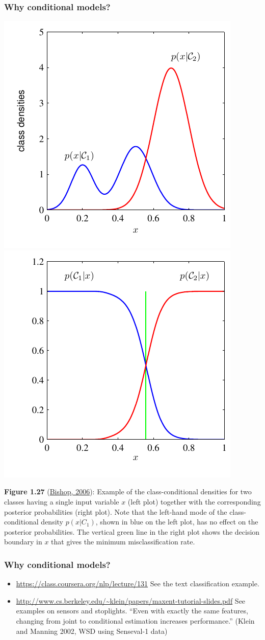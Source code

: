 \documentclass[ignorenonframetext,plain,fleqn]{beamer}
\begin{document}
\begin{frame}\frametitle{Why conditional models?}
\begin{center}
\includegraphics[width=.5\textwidth]{images/bishop-fig-1-27a.pdf}
\includegraphics[width=.5\textwidth]{images/bishop-fig-1-27b.pdf}
\end{center}
\scriptsize {\bf Figure 1.27}
(\href{http://research.microsoft.com/en-us/um/people/cmbishop/prml}
{Bishop, 2006}): Example of the class-conditional densities for two
classes having a single input variable $x$ (left plot) together with
the corresponding posterior probabilities (right plot). Note that the
left-hand mode of the class-conditional density $p(x|C_1)$, shown in
blue on the left plot, has no effect on the posterior
probabilities. The vertical green line in the right plot shows the
decision boundary in $x$ that gives the minimum misclassiﬁcation rate.
\end{frame}

\begin{frame}\frametitle{Why conditional models?}
\begin{itemize}
\item \url{https://class.coursera.org/nlp/lecture/131}  See the text
  classification example.
\item
  \url{http://www.cs.berkeley.edu/~klein/papers/maxent-tutorial-slides.pdf}
  See examples on sensors and stoplights.  ``Even with exactly the
  same features, changing from joint to conditional estimation
  increases performance.''  (Klein and Manning 2002, WSD using
  Senseval-1 data)
\end{itemize}
\end{frame}
\end{document}
